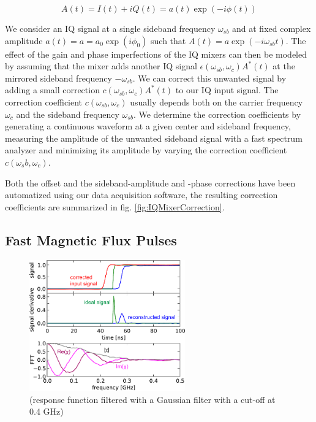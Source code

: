 \begin{equation}
A(t) = I(t)+iQ(t) = a(t)\exp{(-i\phi(t))}
\end{equation}

We consider an IQ signal at a single sideband frequency $\omega_{sb}$ and at fixed complex amplitude $a(t) = a = a_0\exp{(i\phi_0)}$ such that $A(t) = a\exp{(-i \omega_{sb} t)}$. The effect of the gain and phase imperfections of the IQ mixers can then be modeled by assuming that the mixer adds another IQ signal $\epsilon(\omega_{sb},\omega_c)A^*(t)$ at the mirrored sideband frequency $-\omega_{sb}$. We can correct this unwanted signal by adding a small correction $c(\omega_{sb},\omega_c)A^*(t)$ to our IQ input signal. The correction coefficient $c(\omega_{sb},\omega_c)$ usually depends both on the carrier frequency $\omega_c$ and the sideband frequency $\omega_{sb}$. We determine the correction coefficients by generating a continuous waveform at a given center and sideband frequency, measuring the amplitude of the unwanted sideband signal with a fast spectrum analyzer and minimizing its amplitude by varying the correction coefficient $c(\omega_sb,\omega_c)$.

Both the offset and the sideband-amplitude and -phase corrections have been automatized using our data acquisition software, the resulting correction coefficients are summarized in fig. \ref{fig:IQMixerCorrection}.	

\subsection{Fast Magnetic Flux Pulses}

\begin{figure}
   \flushright
	 \includegraphics[width=0.6\textwidth]{"./data/ct5/2011_04_04 - flux tomography/flux tomography"}
	 \caption[]{(response function filtered with a Gaussian filter with a cut-off at 0.4 GHz)}
	 \label{fig:FluxLineResponseFunction}
\end{figure}

